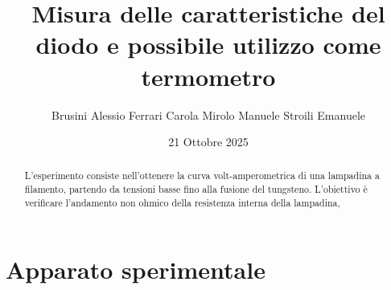 \documentclass[10pt,twocolumn]{article}
\begin{document}
\justifying
	\title{\textbf{Misura delle caratteristiche del diodo e possibile utilizzo come termometro}}
	\author{Brusini Alessio \hspace{0.7cm} Ferrari Carola \hspace{0.7cm} Mirolo Manuele \hspace{0.7cm} Stroili Emanuele}
	\date{21 Ottobre 2025}
	\maketitle
	\onecolumn
	\tableofcontents
\vspace{3cm}
	\begin{abstract}
		\centering
		\large
    L'esperimento consiste nell'ottenere la curva volt-amperometrica di una 
    lampadina a filamento, partendo da tensioni basse fino alla fusione del 
    tungsteno. L'obiettivo è verificare l'andamento non ohmico della resistenza
    interna della lampadina, 
       
	\end{abstract}

	\newpage
\restoregeometry
\twocolumn

\section{Apparato sperimentale}
\end{document}
